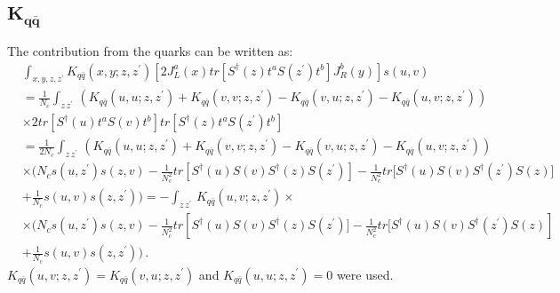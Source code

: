 \documentclass[11pt,a4paper]{article}
\begin{document}
\subsection*{$\mathbf{K_{q\bar{q}}}$}

The contribution from the quarks can be written as:
\begin{equation}\begin{split}
&\int_{x,y,z,z^{\prime}}K_{q\bar{q}}(x,y;z,z^{\prime})\left[2J_{L}^{a}(x)tr\left[S^{\dagger}(z)t^{a}S(z^{\prime})t^{b}\right]J_{R}^{b}(y)\right]s(u,v)\\
&=\frac{1}{N_{c}}\int_{z\, z^{\prime}}\,\left(K_{q\bar{q}}(u,u;z,z^{\prime})+K_{q\bar{q}}(v,v;z,z^{\prime})-K_{q\bar{q}}(v,u;z,z^{\prime})-K_{q\bar{q}}(u,v;z,z^{\prime})\right)\\
&\times 2tr\left[S^{\dagger}(u)t^{a}S(v)t^{b}\right]tr\left[S^{\dagger}(z)t^{a}S(z^{\prime})t^{b}\right]\\
&=\frac{1}{2N_{c}}\int_{z\, z^{\prime}}\,\left(K_{q\bar{q}}(u,u;z,z^{\prime})+K_{q\bar{q}}(v,v;z,z^{\prime})-K_{q\bar{q}}(v,u;z,z^{\prime})-K_{q\bar{q}}(u,v;z,z^{\prime})\right)\\
&\times \Big(N_{c}s(u,z^{\prime})s(z,v)-\frac{1}{N_{c}^{2}}tr\left[S^{\dagger}(u)S(v)S^{\dagger}(z)S(z^{\prime})\right]-\frac{1}{N_{c}^{2}}tr\Big[S^{\dagger}(u)S(v)S^{\dagger}(z^{\prime})S(z)\Big]\\ &+\frac{1}{N_{c}}s(u,v)s(z,z^{\prime})\Big)= -\int_{z\, z^{\prime}}\, K_{q\bar{q}}(u,v;z,z^{\prime})\times\\
&\times\Big(N_{c}s(u,z^{\prime})s(z,v)-\frac{1}{N_{c}^{2}}tr\left[S^{\dagger}(u)S(v)S^{\dagger}(z)S(z^{\prime})\Big]-\frac{1}{N_{c}^{2}}tr\Big[S^{\dagger}(u)S(v)S^{\dagger}(z^{\prime})S(z)\right]\\ & +\frac{1}{N_{c}}s(u,v)s(z,z^{\prime})\Big)\,.
\end{split}\end{equation}
$K_{q\bar{q}}(u,v;z,z^{\prime})=K_{q\bar{q}}(v,u;z,z^{\prime})$ and  $K_{q\bar{q}}(u,u;z,z^{\prime})=0$ were used.
\end{document}
